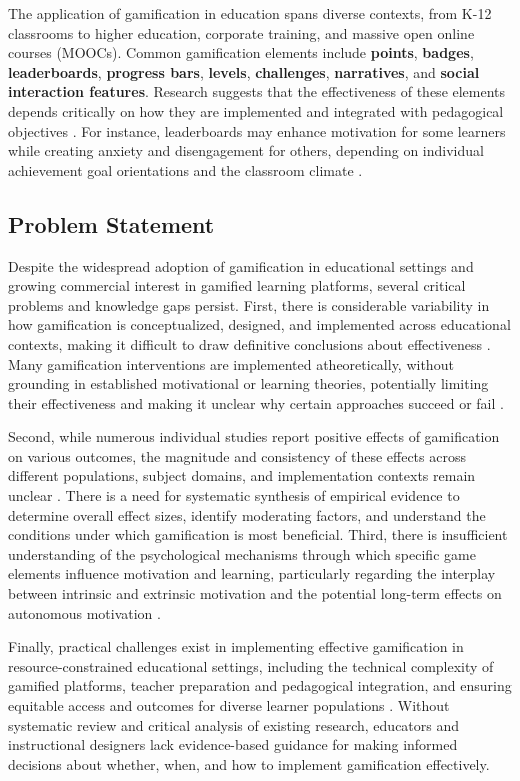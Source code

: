 \documentclass[12pt,a4paper]{article}
\begin{document}
\begin{justify}
The application of gamification in education spans diverse contexts, from K-12 classrooms to higher education, corporate training, and massive open online courses (MOOCs). Common gamification elements include \textbf{points}, \textbf{badges}, \textbf{leaderboards}, \textbf{progress bars}, \textbf{levels}, \textbf{challenges}, \textbf{narratives}, and \textbf{social interaction features}. Research suggests that the effectiveness of these elements depends critically on how they are implemented and integrated with pedagogical objectives \parencite{wu2024,rodriguez2025}. For instance, leaderboards may enhance motivation for some learners while creating anxiety and disengagement for others, depending on individual achievement goal orientations and the classroom climate \parencite{ryan2025}.


\subsection{Problem Statement}

Despite the widespread adoption of gamification in educational settings and growing commercial interest in gamified learning platforms, several critical problems and knowledge gaps persist. First, there is considerable variability in how gamification is conceptualized, designed, and implemented across educational contexts, making it difficult to draw definitive conclusions about effectiveness \parencite{wu2024}. Many gamification interventions are implemented atheoretically, without grounding in established motivational or learning theories, potentially limiting their effectiveness and making it unclear why certain approaches succeed or fail \parencite{ryan2025}.

Second, while numerous individual studies report positive effects of gamification on various outcomes, the magnitude and consistency of these effects across different populations, subject domains, and implementation contexts remain unclear \parencite{wu2024}. There is a need for systematic synthesis of empirical evidence to determine overall effect sizes, identify moderating factors, and understand the conditions under which gamification is most beneficial. Third, there is insufficient understanding of the psychological mechanisms through which specific game elements influence motivation and learning, particularly regarding the interplay between intrinsic and extrinsic motivation and the potential long-term effects on autonomous motivation \parencite{ryan2025}.

Finally, practical challenges exist in implementing effective gamification in resource-constrained educational settings, including the technical complexity of gamified platforms, teacher preparation and pedagogical integration, and ensuring equitable access and outcomes for diverse learner populations \parencite{rodriguez2025}. Without systematic review and critical analysis of existing research, educators and instructional designers lack evidence-based guidance for making informed decisions about whether, when, and how to implement gamification effectively.


\end{justify}
\end{document}
